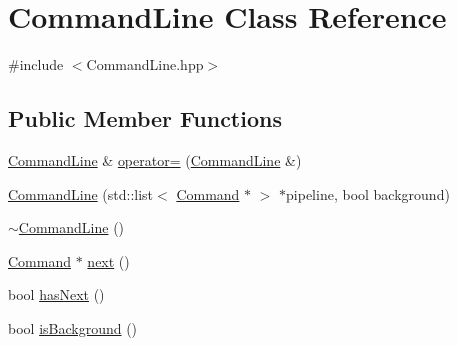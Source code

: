 \hypertarget{classCommandLine}{
\section{CommandLine Class Reference}
\label{classCommandLine}
}


{\ttfamily \#include $<$CommandLine.hpp$>$}

\subsection*{Public Member Functions}
\begin{DoxyCompactItemize}
\item 
\hyperlink{classCommandLine}{CommandLine} \& \hyperlink{classCommandLine_af14743d91891651d369d18644c2f4bb3}{operator=} (\hyperlink{classCommandLine}{CommandLine} \&)
\item 
\hyperlink{classCommandLine_a5c92f3c1c27926725eba68012f94d037}{CommandLine} (std::list$<$ \hyperlink{classCommand}{Command} $\ast$ $>$ $\ast$pipeline, bool background)
\item 
\hyperlink{classCommandLine_ac359efccafe57f845b1f747a9db3c6d9}{$\sim$CommandLine} ()
\item 
\hyperlink{classCommand}{Command} $\ast$ \hyperlink{classCommandLine_a34c3031124c1716e37170c5e60b487b2}{next} ()
\item 
bool \hyperlink{classCommandLine_a1994cb40c62ba84af078662842009a0b}{hasNext} ()
\item 
bool \hyperlink{classCommandLine_a4dfa18cb1625e1d25c6e5e68bbbc712e}{isBackground} ()
\end{DoxyCompactItemize}


